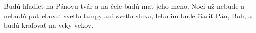 Budú hľadieť na Pánovu tvár a na čele budú mať jeho meno. Noci
už nebude a nebudú potrebovať svetlo lampy ani svetlo slnka, lebo
im bude žiariť Pán, Boh, a budú kraľovať na veky vekov.
